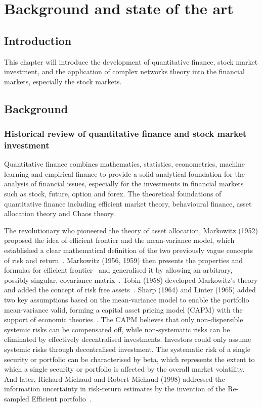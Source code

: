 \chapter[Background]{Background and state of the art}
\label{cpt:back}

\section{Introduction}
This chapter will introduce the development of quantitative finance, stock market investment, and the application of complex networks theory into the financial markets, especially the stock markets.

\section{Background}
\subsection{Historical review of quantitative finance and stock market investment}
Quantitative finance combines mathematics, statistics, econometrics, machine learning and empirical finance to provide a solid analytical foundation for the analysis of financial issues, especially for the investments in financial markets such as stock, future, option and forex. The theoretical foundations of quantitative finance including efficient market theory, behavioural finance, asset allocation theory and Chaos theory.

The revolutionary who pioneered the theory of asset allocation, Markowitz (1952) proposed the idea of efficient frontier and the mean-variance model, which established a clear mathematical definition of the two previously vague concepts of risk and return~\cite{portfolio}. Markowitz (1956, 1959) then presents the properties and formulas for efficient frontier~\cite{markowitz1956optimization} and generalised it by allowing an arbitrary, possibly singular, covariance matrix~\cite{markowitz1959portfolio}. Tobin (1958) developed Markowitz's theory and added the concept of risk free assets~\cite{tobin1958liquidity}. Sharp (1964) and Linter (1965) added two key assumptions based on the mean-variance model to enable the portfolio mean-variance valid, forming a capital asset pricing model (CAPM) with the support of economic theories~\cite{equilibrium, diversification}. The CAPM believes that only non-dispersible systemic risks can be compensated off, while non-systematic risks can be eliminated by effectively decentralised investments. Investors could only assume systemic risks through decentralised investment. The systematic risk of a single security or portfolio can be characterised by beta, which represents the extent to which a single security or portfolio is affected by the overall market volatility. And later, Richard Michaud and Robert Michaud (1998) addressed the information uncertainty in risk-return estimates by the invention of the Re-sampled Efficient portfolio~\cite{michaud1998asset}.

